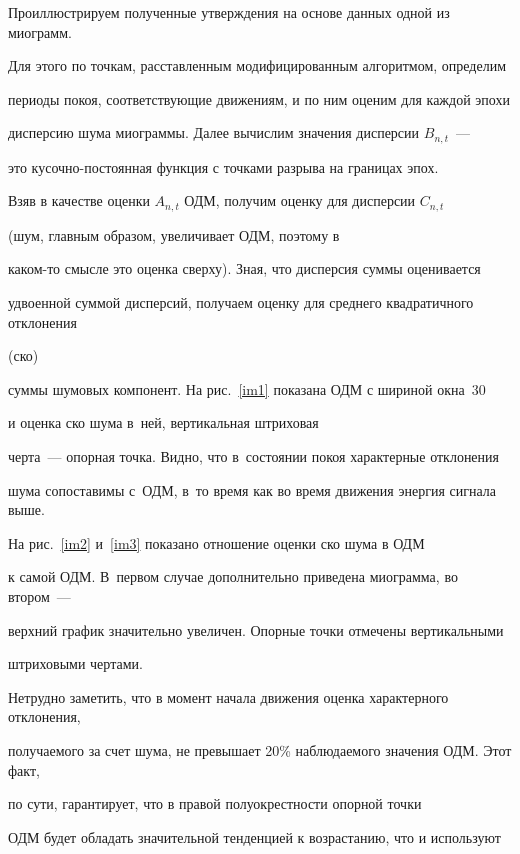 Проиллюстрируем полученные утверждения на основе данных одной из миограмм.


Для этого по точкам, расставленным модифицированным алгоритмом, определим


периоды покоя, соответствующие движениям, и по ним оценим для каждой эпохи


дисперсию шума миограммы. Далее вычислим значения дисперсии $B_{n,t}$~---


это ку\-соч\-но-по\-сто\-ян\-ная функция с точками разрыва на границах эпох.


Взяв в качестве оценки $A_{n,t}$ ОДМ, получим оценку для дисперсии $C_{n,t}$


(шум, главным образом, увеличивает ОДМ, поэтому в


ка\-ком-то смысле это оценка сверху). Зная, что дисперсия суммы оценивается


удвоенной суммой дисперсий, получаем оценку для среднего квадратичного отклонения


(ско)


суммы шумовых компонент. На рис.~\ref{im1} показана ОДМ с шириной окна~30


и оценка ско шума в~ней, вертикальная штриховая


черта~--- опорная точка. Видно, что в~со\-сто\-янии покоя характерные отклонения


шума сопоставимы с~ОДМ, в~то время как во время движения энергия сигнала выше.











На рис.~\ref{im2} и~\ref{im3} показано отношение оценки ско шума в ОДМ


к самой ОДМ. В~первом случае дополнительно приведена миограмма, во втором~---


верхний график значительно увеличен. Опорные точки отмечены вертикальными


штриховыми чертами.


Нетрудно заметить, что в момент начала движения оценка характерного отклонения,


получаемого за счет шума, не превышает 20\% наблюдаемого значения ОДМ. Этот факт,


по сути, гарантирует, что в правой полуокрестности опорной точки


ОДМ будет обладать значительной тенденцией к возрастанию, что и используют


